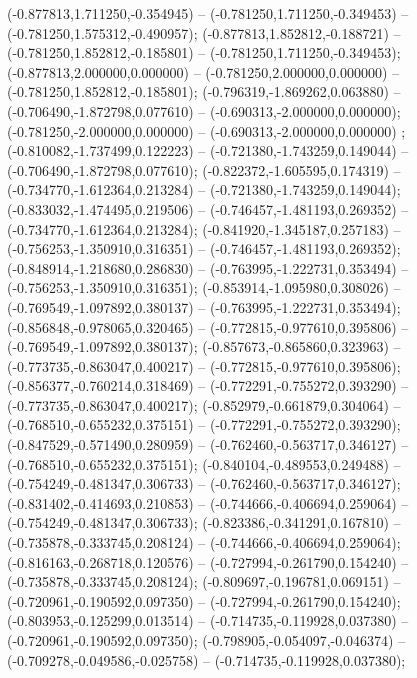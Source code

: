  (-0.877813,1.711250,-0.354945) -- (-0.781250,1.711250,-0.349453) -- (-0.781250,1.575312,-0.490957);
 (-0.877813,1.852812,-0.188721) -- (-0.781250,1.852812,-0.185801) -- (-0.781250,1.711250,-0.349453);
 (-0.877813,2.000000,0.000000) -- (-0.781250,2.000000,0.000000) -- (-0.781250,1.852812,-0.185801);
 (-0.796319,-1.869262,0.063880) -- (-0.706490,-1.872798,0.077610) -- (-0.690313,-2.000000,0.000000);
 (-0.781250,-2.000000,0.000000) -- (-0.690313,-2.000000,0.000000) ;
 (-0.810082,-1.737499,0.122223) -- (-0.721380,-1.743259,0.149044) -- (-0.706490,-1.872798,0.077610);
 (-0.822372,-1.605595,0.174319) -- (-0.734770,-1.612364,0.213284) -- (-0.721380,-1.743259,0.149044);
 (-0.833032,-1.474495,0.219506) -- (-0.746457,-1.481193,0.269352) -- (-0.734770,-1.612364,0.213284);
 (-0.841920,-1.345187,0.257183) -- (-0.756253,-1.350910,0.316351) -- (-0.746457,-1.481193,0.269352);
 (-0.848914,-1.218680,0.286830) -- (-0.763995,-1.222731,0.353494) -- (-0.756253,-1.350910,0.316351);
 (-0.853914,-1.095980,0.308026) -- (-0.769549,-1.097892,0.380137) -- (-0.763995,-1.222731,0.353494);
 (-0.856848,-0.978065,0.320465) -- (-0.772815,-0.977610,0.395806) -- (-0.769549,-1.097892,0.380137);
 (-0.857673,-0.865860,0.323963) -- (-0.773735,-0.863047,0.400217) -- (-0.772815,-0.977610,0.395806);
 (-0.856377,-0.760214,0.318469) -- (-0.772291,-0.755272,0.393290) -- (-0.773735,-0.863047,0.400217);
 (-0.852979,-0.661879,0.304064) -- (-0.768510,-0.655232,0.375151) -- (-0.772291,-0.755272,0.393290);
 (-0.847529,-0.571490,0.280959) -- (-0.762460,-0.563717,0.346127) -- (-0.768510,-0.655232,0.375151);
 (-0.840104,-0.489553,0.249488) -- (-0.754249,-0.481347,0.306733) -- (-0.762460,-0.563717,0.346127);
 (-0.831402,-0.414693,0.210853) -- (-0.744666,-0.406694,0.259064) -- (-0.754249,-0.481347,0.306733);
 (-0.823386,-0.341291,0.167810) -- (-0.735878,-0.333745,0.208124) -- (-0.744666,-0.406694,0.259064);
 (-0.816163,-0.268718,0.120576) -- (-0.727994,-0.261790,0.154240) -- (-0.735878,-0.333745,0.208124);
 (-0.809697,-0.196781,0.069151) -- (-0.720961,-0.190592,0.097350) -- (-0.727994,-0.261790,0.154240);
 (-0.803953,-0.125299,0.013514) -- (-0.714735,-0.119928,0.037380) -- (-0.720961,-0.190592,0.097350);
 (-0.798905,-0.054097,-0.046374) -- (-0.709278,-0.049586,-0.025758) -- (-0.714735,-0.119928,0.037380);
